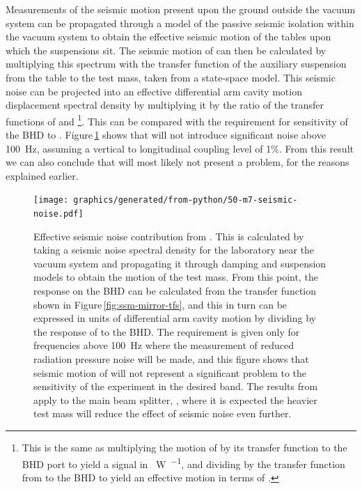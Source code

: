Measurements of the seismic motion present upon the ground outside the vacuum system can be propagated through a model of the passive seismic isolation within the vacuum system to obtain the effective seismic motion of the tables upon which the suspensions sit. The seismic motion of \MSEVEN{} can then be calculated by multiplying this spectrum with the transfer function of the auxiliary suspension from the table to the test mass, taken from a state-space model. This seismic noise can be projected into an effective differential arm cavity motion displacement spectral density by multiplying it by the ratio of the transfer functions of \MSEVEN{} and \LMINUS{}\footnote{This is the same as multiplying the motion of \MSEVEN{} by its transfer function to the \gls{BHD} port to yield a signal in \SI{}{\watt\per\sqrthz}, and dividing by the transfer function from \LMINUS{} to the \gls{BHD} to yield an effective motion in terms of \LMINUS{}.}. This can be compared with the requirement for sensitivity of the \gls{BHD} to \LMINUS{}. Figure\,\ref{fig:m7-seismic-noise} shows that \MSEVEN{} will not introduce significant noise above \SI{100}{\hertz}, assuming a vertical to longitudinal coupling level of 1\%. From this result we can also conclude that \MSIX{} will most likely not present a problem, for the reasons explained earlier.

\begin{figure}
  \centering
  \texttt{[image: graphics/generated/from-python/50-m7-seismic-noise.pdf]}
  \caption[Effective \LMINUS{} seismic noise contribution from \MSEVEN{}]{\label{fig:m7-seismic-noise}Effective \LMINUS{} seismic noise contribution from \MSEVEN{}. This is calculated by taking a seismic noise spectral density for the laboratory near the vacuum system and propagating it through damping and suspension models to obtain the motion of the \MSEVEN{} test mass. From this point, the response on the \gls{BHD} can be calculated from the transfer function shown in Figure\,\ref{fig:ssm-mirror-tfs}, and this in turn can be expressed in units of differential arm cavity motion by dividing by the response of \LMINUS{} to the \gls{BHD}. The requirement is given only for frequencies above \SI{100}{\hertz} where the measurement of reduced radiation pressure noise will be made, and this figure shows that seismic motion of \MSEVEN{} will not represent a significant problem to the sensitivity of the experiment in the desired band. The results from \MSEVEN{} apply to the main beam splitter, \MSIX{}, where it is expected the heavier test mass will reduce the effect of seismic noise even further.}
\end{figure}

